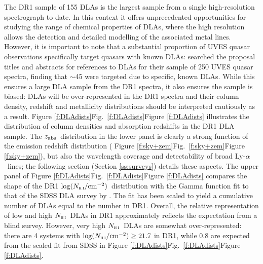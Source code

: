 \documentclass[fleqn,usenatbib,usedcolumn]{mnras}
\newcommand{\Sref}[1]{Section \ref{#1}}
\newcommand{\Fref}[1]{\ifhmode \ifnum\spacefactor=1001 Figure \ref{#1}\else Fig.\ \ref{#1}\fi \else Figure \ref{#1}\fi}
\newcommand{\lya}{\ensuremath{\textrm{Ly-}\alpha}}
\newcommand{\zab}{\ensuremath{z_\textrm{\scriptsize abs}}}
\newcommand{\NHI}{\ensuremath{N_\textsc{h\scriptsize{\,i}}}}
\newcommand{\lNHI}{\ensuremath{\log(N_\textsc{h\scriptsize{\,i}}/\textrm{cm}^{-2})}}
\begin{document}
The DR1 sample of 155 DLAs is the largest sample from a single high-resolution spectrograph to date. In this context it offers unprecedented opportunities for studying the range of chemical properties of DLAs, where the high resolution allows the detection and detailed modelling of the associated metal lines. However, it is important to note that a substantial proportion of UVES quasar observations specifically target quasars with known DLAs: \citet{Zafar:2013:A141} searched the proposal titles and abstracts for references to DLAs for their sample of 250 UVES quasar spectra, finding that $\sim$45 were targeted due to specific, known DLAs. While this ensures a large DLA sample from the DR1 spectra, it also ensures the sample is biased: DLAs will be over-represented in the DR1 spectra and their column density, redshift and metallicity distributions should be interpreted cautiously as a result. \Fref{f:DLAdists} illustrates the distribution of  column densities and absorption redshifts in the DR1 DLA sample. The \zab\ distribution in the lower panel is clearly a strong function of the emission redshift distribution (\Fref{f:sky+zem}), but also the wavelength coverage and detectability of broad \lya\ lines; the following section (\Sref{ss:surveys}) details these aspects. The upper panel of \Fref{f:DLAdists} compares the shape of the DR1 \lNHI\ distribution with the Gamma function fit to that of the SDSS DLA survey by \citet{Noterdaeme:2009:1087}. The fit has been scaled to yield a cumulative number of DLAs equal to the number in DR1. Overall, the relative representation of low and high \NHI\ DLAs in DR1 approximately reflects the expectation from a blind survey. However, very high \NHI\ DLAs are somewhat over-represented: there are 4 systems with $\lNHI\ge21.7$ in DR1, while 0.8 are expected from the scaled fit from SDSS in \Fref{f:DLAdists}.
\end{document}
